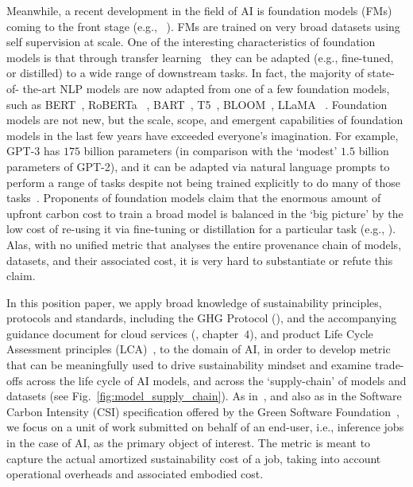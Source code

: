{    Meanwhile, a recent development in the field of AI is foundation models (FMs) coming to the front stage (e.g., ~\cite{Rishi2022}). FMs are trained on very broad datasets using self supervision at scale. One of the interesting characteristics of foundation models is that through transfer learning~\cite{Thrun1998} they can be adapted (e.g., fine-tuned, or distilled) to a wide range of downstream tasks. In fact, the majority of state-of- the-art NLP models are now adapted from one of a few foundation models, such as BERT~\cite{Devlin2018}, RoBERTa ~\cite{Liu2019}, BART~\cite{Lewis2019}, T5~\cite{Raffel2020}, BLOOM~\cite{Workshop2023Bloom}, LLaMA ~\cite{Touvron2023}. Foundation models are not new, but the scale, scope, and emergent capabilities of foundation models in the last few years have exceeded everyone's imagination. For example, GPT-3 has $175$ billion parameters (in comparison with the `modest' $1.5$ billion parameters of GPT-2), and it can be adapted via natural language prompts to perform a range of tasks despite not being trained explicitly to do many of those tasks~\cite{Brown2020}. Proponents of foundation models claim that the enormous amount of upfront carbon cost to train a broad model is balanced in the `big picture' by the low cost of re-using it via fine-tuning or distillation for a particular task (e.g., \cite{Rishi2022}). Alas, with no unified metric that analyses the entire provenance chain of models, datasets, and their associated cost, it is very hard to substantiate or refute this claim.

    In this position paper, we apply broad knowledge of sustainability principles, protocols and standards, including the GHG Protocol (\cite{GHG-Protocol}), and the accompanying guidance document for cloud services (\cite{GHG-Guidance}, chapter~$4$), and product Life Cycle Assessment principles (LCA)~\cite{LCA}, to the domain of AI, in order to develop metric that can be meaningfully used to drive sustainability mindset and examine trade-offs across the life cycle of AI models, and across the `supply-chain' of models and datasets (see Fig.~\ref{fig:model_supply_chain}). As in~\cite{Gandhi2022}, and also as in the Software Carbon Intensity (CSI) specification offered by the Green Software Foundation~\cite{GSF}, we focus on a unit of work submitted on behalf of an end-user, i.e., inference jobs in the case of AI, as the primary object of interest. The metric is meant to capture the actual amortized sustainability cost of a job, taking into account operational overheads and associated embodied cost.

}
